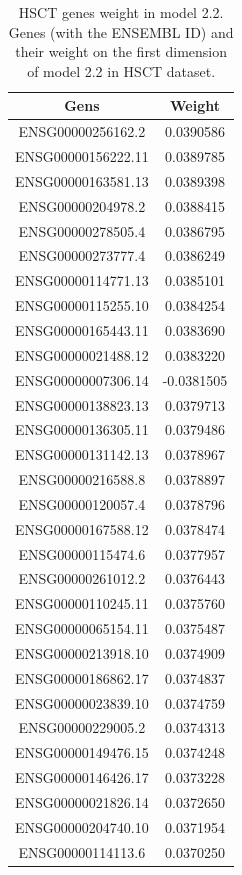 \documentclass[
  12pt,
  a4paper,
  twoside,
  openright]{book}
\begin{document}
\begin{longtable}[t]{cc}
\caption[HSCT genes weight in model 2.2]{\label{tab:hsct-genes-2-2}HSCT genes weight in model 2.2. Genes (with the ENSEMBL ID) and their weight on the first dimension of model 2.2 in HSCT dataset.}\\
\toprule
Gens & Weight\\
\midrule
ENSG00000256162.2 & 0.0390586\\
ENSG00000156222.11 & 0.0389785\\
ENSG00000163581.13 & 0.0389398\\
ENSG00000204978.2 & 0.0388415\\
ENSG00000278505.4 & 0.0386795\\
\addlinespace
ENSG00000273777.4 & 0.0386249\\
ENSG00000114771.13 & 0.0385101\\
ENSG00000115255.10 & 0.0384254\\
ENSG00000165443.11 & 0.0383690\\
ENSG00000021488.12 & 0.0383220\\
\addlinespace
ENSG00000007306.14 & -0.0381505\\
ENSG00000138823.13 & 0.0379713\\
ENSG00000136305.11 & 0.0379486\\
ENSG00000131142.13 & 0.0378967\\
ENSG00000216588.8 & 0.0378897\\
\addlinespace
ENSG00000120057.4 & 0.0378796\\
ENSG00000167588.12 & 0.0378474\\
ENSG00000115474.6 & 0.0377957\\
ENSG00000261012.2 & 0.0376443\\
ENSG00000110245.11 & 0.0375760\\
\addlinespace
ENSG00000065154.11 & 0.0375487\\
ENSG00000213918.10 & 0.0374909\\
ENSG00000186862.17 & 0.0374837\\
ENSG00000023839.10 & 0.0374759\\
ENSG00000229005.2 & 0.0374313\\
\addlinespace
ENSG00000149476.15 & 0.0374248\\
ENSG00000146426.17 & 0.0373228\\
ENSG00000021826.14 & 0.0372650\\
ENSG00000204740.10 & 0.0371954\\
ENSG00000114113.6 & 0.0370250\\
\bottomrule
\end{longtable}
\end{document}
